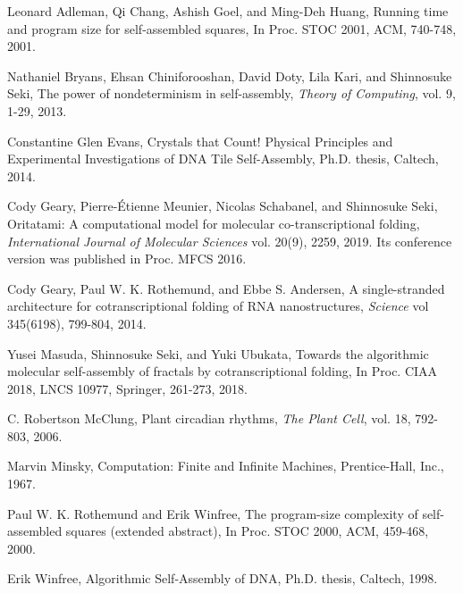 \documentclass{llncs}
\begin{document}
\begin{thebibliography}{1}

Leonard Adleman, Qi Chang, Ashish Goel, and Ming-Deh Huang, 
Running time and program size for self-assembled squares, 
In Proc. STOC 2001, ACM, 740-748, 2001. 

Nathaniel Bryans, Ehsan Chiniforooshan, David Doty, Lila Kari, and Shinnosuke Seki, 
The power of nondeterminism in self-assembly, 
\textit{Theory of Computing}, vol. 9, 1-29, 2013.

Constantine Glen Evans, 
Crystals that Count! Physical Principles and Experimental Investigations of {DNA} Tile Self-Assembly, 
Ph.D. thesis, Caltech, 2014.

Cody Geary, Pierre-\'{E}tienne Meunier, Nicolas Schabanel, and Shinnosuke Seki, 
Oritatami: A computational model for molecular co-transcriptional folding, 
\textit{International Journal of Molecular Sciences} vol. 20(9), 2259, 2019. Its conference version was published in Proc. MFCS 2016. 

Cody Geary, Paul W. K. Rothemund, and Ebbe S. Andersen, 
A single-stranded architecture for cotranscriptional folding of {RNA} nanostructures, 
\textit{Science} vol 345(6198), 799-804, 2014.

Yusei Masuda, Shinnosuke Seki, and Yuki Ubukata, 
Towards the algorithmic molecular self-assembly of fractals by cotranscriptional folding, 
In Proc. CIAA 2018, LNCS 10977, Springer, 261-273, 2018.

C. Robertson McClung, 
Plant circadian rhythms, 
\textit{The Plant Cell}, vol. 18, 792-803, 2006.

Marvin Minsky, 
Computation: Finite and Infinite Machines, 
Prentice-Hall, Inc., 1967. 

Paul W. K. Rothemund and Erik Winfree, 
The program-size complexity of self-assembled squares (extended abstract), 
In Proc. STOC 2000, ACM, 459-468, 2000.

Erik Winfree, 
Algorithmic Self-Assembly of {DNA}, 
Ph.D. thesis, Caltech, 1998.

\end{thebibliography}
\end{document}
